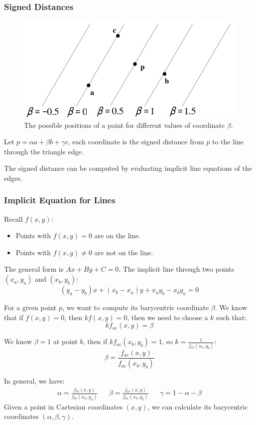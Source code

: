 \documentclass[11pt]{article}
\begin{document}
\subsubsection{Signed Distances}
\begin{figure}[htb!]
  \centering
  \caption{The possible positions of a point for different values of coordinate $\beta$.}
  \includegraphics[scale=0.5]{signeddistances}
\end{figure}
Let $p = \alpha a + \beta b + \gamma c$, each coordinate is the signed distance from $p$ to the line through the triangle edge.

The signed distance can be computed by evaluating implicit line equations of the edges.

\subsubsection{Implicit Equation for Lines}
Recall $f(x, y)$:
\begin{itemize}
  \item Points with $f(x, y) = 0$ are on the line.
  \item Points with $f(x, y) \neq 0$ are not on the line.
\end{itemize}

The general form is $Ax + By + C = 0$.
The implicit line through two points $(x_a, y_a)$ and $(x_b, y_b)$:
\[
  (y_a - y_b) x + (x_b - x_a) y + x_a y_b - x_b y_a = 0 
\]

For a given point $p$, we want to compute its barycentric coordinate $\beta$.
We know that if $f(x, y) = 0$, then $kf(x, y) = 0$, then we need to choose a $k$ such that:
\[
  kf_{ac} (x, y) = \beta 
\]

We know $\beta = 1$ at point $b$, then if $kf_{ac}(x_b, y_b) = 1$, so $k = \frac{1}{f_{ac}(x_b, y_b)}$:
\[
  \beta = \frac{f_{ac}(x, y)}{f_{ac}(x_b, y_b)}
\]

In general, we have:
\begin{align*}
  \alpha = \frac{f_{bc}(x, y)}{f_{bc}(x_a, y_a)} &&
  \beta = \frac{f_{ac}(x, y)}{f_{ac}(x_b, y_b)} &&
  \gamma = 1 - \alpha - \beta
\end{align*}
Given a point in Cartesian coordinates $(x, y)$, we can calculate its barycentric coordinates $(\alpha, \beta, \gamma)$.
\end{document}
